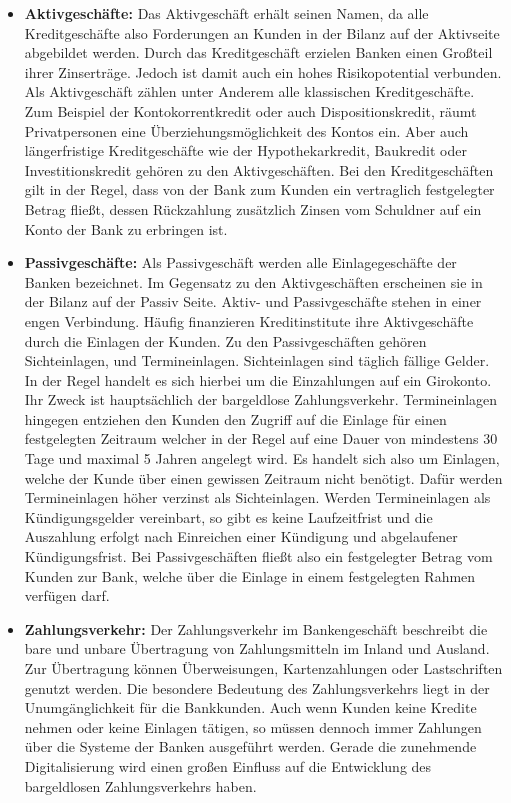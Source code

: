 \documentclass[12pt,oneside,a4paper,parskip]{scrbook}
\begin{document}
\begin{itemize}
  \item \textbf{Aktivgeschäfte:} Das Aktivgeschäft erhält seinen Namen, da alle Kreditgeschäfte also Forderungen an Kunden in der Bilanz auf der Aktivseite abgebildet werden. Durch das Kreditgeschäft erzielen Banken einen Großteil ihrer Zinserträge. Jedoch ist damit auch ein hohes Risikopotential verbunden. Als Aktivgeschäft zählen unter Anderem alle klassischen Kreditgeschäfte.
  Zum Beispiel der Kontokorrentkredit oder auch Dispositionskredit, räumt Privatpersonen eine Überziehungsmöglichkeit des Kontos ein. Aber auch längerfristige Kreditgeschäfte wie der Hypothekarkredit, Baukredit oder Investitionskredit gehören zu den Aktivgeschäften. Bei den Kreditgeschäften gilt in der Regel, dass von der Bank zum Kunden ein vertraglich festgelegter Betrag fließt, dessen Rückzahlung zusätzlich Zinsen vom Schuldner auf ein Konto der Bank zu erbringen ist.
  \item \textbf{Passivgeschäfte:} Als Passivgeschäft werden alle Einlagegeschäfte der Banken bezeichnet. Im Gegensatz zu den Aktivgeschäften erscheinen sie in der Bilanz auf der Passiv Seite. Aktiv- und Passivgeschäfte stehen in einer engen Verbindung. Häufig finanzieren Kreditinstitute ihre Aktivgeschäfte durch die Einlagen der Kunden. Zu den Passivgeschäften gehören Sichteinlagen, und Termineinlagen. Sichteinlagen sind täglich fällige Gelder. In der Regel handelt es sich hierbei um die Einzahlungen auf ein Girokonto. Ihr Zweck ist hauptsächlich der bargeldlose Zahlungsverkehr. Termineinlagen hingegen entziehen den Kunden den Zugriff auf die Einlage für einen festgelegten Zeitraum welcher in der Regel auf eine Dauer von mindestens 30 Tage und maximal 5 Jahren angelegt wird. Es handelt sich also um Einlagen, welche der Kunde über einen gewissen Zeitraum nicht benötigt. Dafür werden Termineinlagen höher verzinst als Sichteinlagen. Werden Termineinlagen als Kündigungsgelder vereinbart, so gibt es keine Laufzeitfrist und die Auszahlung erfolgt nach Einreichen einer Kündigung und abgelaufener Kündigungsfrist. Bei Passivgeschäften fließt also ein festgelegter Betrag vom Kunden zur Bank, welche über die Einlage in einem festgelegten Rahmen verfügen darf.
  \item \textbf{Zahlungsverkehr:} Der Zahlungsverkehr im Bankengeschäft beschreibt die bare und unbare Übertragung von Zahlungsmitteln im Inland und Ausland. Zur Übertragung können Überweisungen, Kartenzahlungen oder Lastschriften genutzt werden. Die besondere Bedeutung des Zahlungsverkehrs liegt in der Unumgänglichkeit für die Bankkunden. Auch wenn Kunden keine Kredite nehmen oder keine Einlagen tätigen, so müssen dennoch immer Zahlungen über die Systeme der Banken ausgeführt werden. Gerade die zunehmende Digitalisierung wird einen großen Einfluss auf die Entwicklung des bargeldlosen Zahlungsverkehrs haben. 
\end{itemize}
\end{document}
